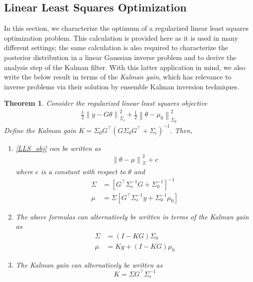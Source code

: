 \documentclass[12pt]{article}
\newcommand*{\norm}[1]{\left\lVert#1\right\rVert}
\newtheorem{thm}{Theorem}
\begin{document}
\subsection{Linear Least Squares Optimization}
In this section, we characterize the optimum of a regularized linear least squares optimization problem. This calculation is provided here as it is used in many different settings; the same calculation is also required to characterize 
the posterior distribution in a linear Gaussian inverse problem and to derive the analysis step of the Kalman filter. With this latter application in mind, we also write the below result in terms of the \textit{Kalman gain}, which has 
relevance to inverse problems via their solution by ensemble Kalman inversion techniques. 

\begin{thm}
Consider the regularized linear least squares objective 
\begin{align}
\frac{1}{2} \norm{y - G\theta}^2_{\Sigma_\epsilon} + \frac{1}{2} \norm{\theta - \mu_0}^2_{\Sigma_0} \label{LLS_obj}
\end{align}
Define the Kalman gain $K = \Sigma_0 G^\top (G \Sigma_0 G^\top + \Sigma_{\epsilon})^{-1}$. Then, 
\begin{enumerate}
\item \ref{LLS_obj} can be written as 
\begin{align}
\norm{\theta - \mu}^2_\Sigma + c \label{LLN_post}
\end{align}
where $c$ is a constant with respect to $\theta$ and 
\begin{align*}
\Sigma &= \left[G^\top \Sigma^{-1}_{\epsilon} G + \Sigma^{-1}_0\right]^{-1} \\
\mu &= \Sigma \left[G^\top \Sigma^{-1}_{\epsilon}y + \Sigma_0^{-1} \mu_0  \right]
\end{align*}

\item The above formulas can alternatively be written in terms of the Kalman gain as 
\begin{align*}
\Sigma &=  (I - KG)\Sigma_0 \\
\mu &= Ky + (I - KG) \mu_0
\end{align*}

\item The Kalman gain can alternatively be written as 
\[K = \Sigma G^\top \Sigma_{\epsilon}^{-1} \]
\end{enumerate}
\end{thm}
\end{document}
